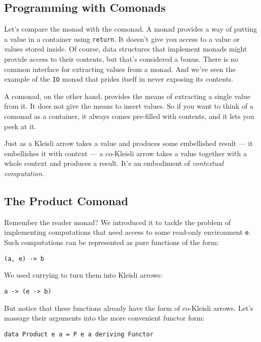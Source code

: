 \subsection{Programming with Comonads}\label{programming-with-comonads}

Let's compare the monad with the comonad. A monad provides a way of
putting a value in a container using \texttt{return}. It doesn't give
you access to a value or values stored inside. Of course, data
structures that implement monads might provide access to their contents,
but that's considered a bonus. There is no common interface for
extracting values from a monad. And we've seen the example of the
\texttt{IO} monad that prides itself in never exposing its contents.

A comonad, on the other hand, provides the means of extracting a single
value from it. It does not give the means to insert values. So if you
want to think of a comonad as a container, it always comes pre-filled
with contents, and it lets you peek at it.

Just as a Kleisli arrow takes a value and produces some embellished
result --- it embellishes it with context --- a co-Kleisli arrow takes a
value together with a whole context and produces a result. It's an
embodiment of \emph{contextual computation}.

\subsection{The Product Comonad}\label{the-product-comonad}

Remember the reader monad? We introduced it to tackle the problem of
implementing computations that need access to some read-only environment
\texttt{e}. Such computations can be represented as pure functions of
the form:

\begin{verbatim}
(a, e) -> b
\end{verbatim}

We used currying to turn them into Kleisli arrows:

\begin{verbatim}
a -> (e -> b)
\end{verbatim}

But notice that these functions already have the form of co-Kleisli
arrows. Let's massage their arguments into the more convenient functor
form:

\begin{verbatim}
data Product e a = P e a deriving Functor
\end{verbatim}

